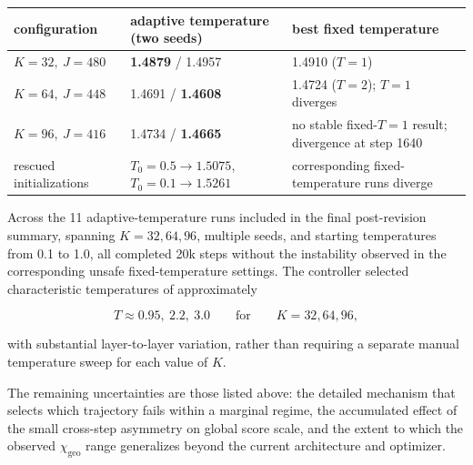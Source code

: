 \documentclass[11pt,a4paper]{article}
\newcommand{\chigeo}{\chi_{\mathrm{geo}}}
\begin{document}
\begin{center}\small
\begin{tabular}{lll}
\toprule
configuration & adaptive temperature (two seeds) & best fixed temperature \\
\midrule
\(K=32,\ J=480\)
& \textbf{1.4879} / 1.4957
& 1.4910 (\(T=1\)) \\

\(K=64,\ J=448\)
& 1.4691 / \textbf{1.4608}
& 1.4724 (\(T=2\)); \(T=1\) diverges \\

\(K=96,\ J=416\)
& 1.4734 / \textbf{1.4665}
& no stable fixed-\(T=1\) result; divergence at step 1640 \\

rescued initializations
& \(T_0=0.5\to1.5075\), \quad \(T_0=0.1\to1.5261\)
& corresponding fixed-temperature runs diverge \\
\bottomrule
\end{tabular}
\end{center}

Across the 11 adaptive-temperature runs included in the final post-revision
summary, spanning \(K=32,64,96\), multiple seeds, and starting temperatures
from 0.1 to 1.0, all completed 20k steps without the instability observed in
the corresponding unsafe fixed-temperature settings. The controller selected
characteristic temperatures of approximately

\[
T\approx0.95,\ 2.2,\ 3.0
\qquad
\text{for}
\qquad
K=32,64,96,
\]

with substantial layer-to-layer variation, rather than requiring a separate
manual temperature sweep for each value of \(K\).

The remaining uncertainties are those listed above: the detailed mechanism
that selects which trajectory fails within a marginal regime, the accumulated
effect of the small cross-step asymmetry on global score scale, and the extent
to which the observed \(\chigeo\) range generalizes beyond the current
architecture and optimizer.
\end{document}
